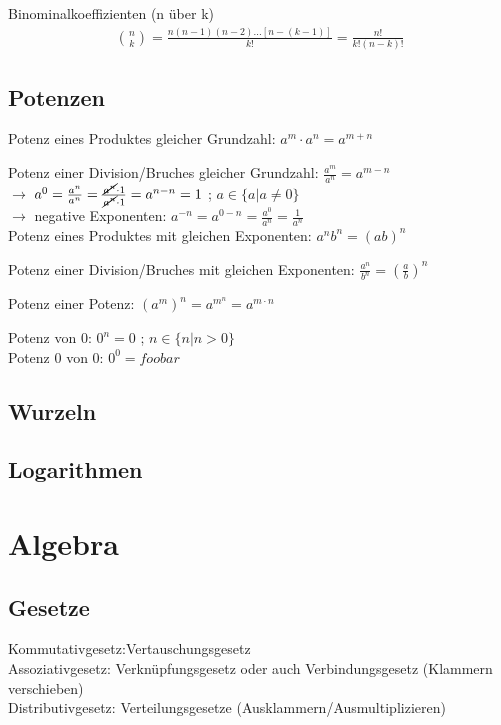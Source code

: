 \documentclass[12pt,a4paper,fleqn,twoside,pdf,final]{article}
\begin{document}
Binominalkoeffizienten (n über k)
\begin{align*}
\binom{n}{k}= \frac{n(n-1)(n-2)...[n-(k-1)] }{k!} =  \frac{n!}{k!(n-k)!}
\end{align*}

\subsection{Potenzen}
Potenz eines Produktes gleicher Grundzahl: 
$a^m \cdot a^n = a^{m+n}$

Potenz einer Division/Bruches gleicher Grundzahl: $ \frac{a^m}{a^n} = a^{m-n}$ \\
$\longrightarrow$ $ a^0 =  \frac{a^n}{a^n} =   \frac{ \cancel{a^n} \cdot 1}{ \cancel{a^n} \cdot 1} = a^{n-n}  = 1$  ; $a \in \{a| a \neq 0\}$ \\
$\longrightarrow$ negative Exponenten: $ a^{-n} =  a^{0-n} =  \frac{a^0}{a^n}  =  \frac{1}{a^n} $ \\

Potenz eines Produktes mit gleichen Exponenten: $ {a^n}{b^n} = (ab)^{n}$ 

Potenz einer Division/Bruches mit gleichen Exponenten: $ \frac{a^n}{b^n} = (\frac{a}{b}) ^n$ 

Potenz einer Potenz: $ (a^m)^n = a^{m^n} = a^{m \cdot n}$ 

Potenz von 0: $ 0^n = 0 $ ;  $n \in\{n | n > 0\}$\\
Potenz 0 von 0: $ 0^0 = foobar $ 

\subsection{Wurzeln}
\subsection{Logarithmen}


\section{Algebra}
\subsection{Gesetze}
Kommutativgesetz:Vertauschungsgesetz \\
Assoziativgesetz: Verknüpfungsgesetz oder auch Verbindungsgesetz (Klammern verschieben) \\
Distributivgesetz: Verteilungsgesetze (Ausklammern/Ausmultiplizieren)
\end{document}

